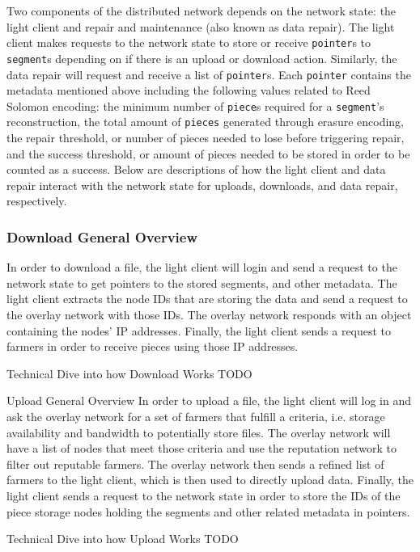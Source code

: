 \documentclass[a4paper,10pt]{article}
\newcommand{\x}[1]{{\tt #1}}
\newcommand{\todo}[1]{{\color{red} TODO #1}}
\begin{document}
Two components of the distributed network depends on the network state: the light
client and repair and maintenance (also known as data repair). The light client
makes requests to the network state to store or receive \x{pointer}s to \x{segment}s
depending on if there is an upload or download action. Similarly, the data repair
will request and receive a list of \x{pointer}s. Each \x{pointer} contains the metadata
mentioned above including the following values related to Reed Solomon encoding: the
minimum number of \x{piece}s required for a \x{segment}'s reconstruction, the total
amount of \x{pieces} generated through erasure encoding, the repair threshold, or
number of pieces needed to lose before triggering repair, and the success threshold,
or amount of pieces needed to be stored in order to be counted as a success. Below
are descriptions of how the light client and data repair interact with the network
state for uploads, downloads, and data repair, respectively.


\subsubsection{Download General Overview}
In order to download a file, the light client will login and send a request to the
network state to get pointers to the stored segments, and other metadata. The light
client extracts the node IDs that are storing the data and send a request to the overlay
network with those IDs. The overlay network responds with an object containing the nodes’
IP addresses. Finally, the light client sends a request to farmers in order to receive
pieces using those IP addresses.


Technical Dive into how Download Works
\todo{}

Upload General Overview
In order to upload a file, the light client will log in and ask the overlay network
for a set of farmers that fulfill a criteria, i.e. storage availability and bandwidth
to potentially store files. The overlay network will have a list of nodes that meet
those criteria and use the reputation network to filter out reputable farmers. The
overlay network then sends a refined list of farmers to the light client, which is
then used to directly upload data. Finally, the light client sends a request to the
network state in order to store the IDs of the piece storage nodes holding the segments
and other related metadata in pointers.


Technical Dive into how Upload Works
\todo{}
\end{document}
